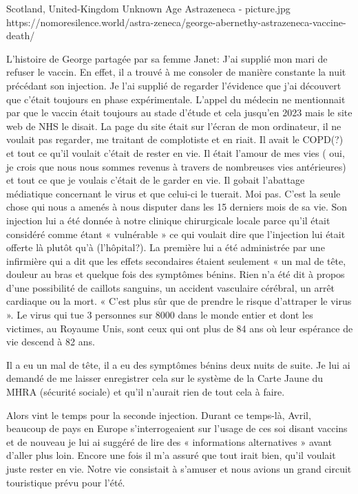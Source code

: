 {Scotland, United-Kingdom}
{Unknown Age}
{Astrazeneca}
{}
{-}
{picture.jpg}
{https://nomoresilence.world/astra-zeneca/george-abernethy-astrazeneca-vaccine-death/}
{

\normalsize

L’histoire de George partagée par sa femme Janet: J’ai supplié mon mari de refuser le vaccin. En effet, il a trouvé à me consoler de manière constante la nuit précédant son injection. Je l’ai supplié de regarder l’évidence que j’ai découvert que c’était toujours en phase expérimentale. L’appel du médecin ne mentionnait par que le vaccin était toujours au stade d’étude et cela jusqu’en 2023 mais le site web de NHS le disait. La page du site était sur l’écran de mon ordinateur, il ne voulait pas regarder, me traitant de complotiste et en riait. Il avait le COPD(?) et tout ce qu’il voulait c’était de rester en vie. Il était l’amour de mes vies ( oui, je crois que nous nous sommes revenus à travers de nombreuses vies antérieures) et tout ce que je voulais c’était de le garder en vie. Il gobait l’abattage médiatique concernant le virus et que celui-ci le tuerait. Moi pas. C’est la seule chose qui nous a amenés à nous disputer dans les 15 derniers mois de sa vie. Son injection lui a été donnée à notre clinique chirurgicale locale parce qu’il était considéré comme étant « vulnérable » ce qui voulait dire que l’injection lui était offerte là plutôt qu’à (l’hôpital?). La première lui a été administrée par une infirmière qui a dit que les effets secondaires étaient seulement « un mal de tête, douleur au bras et quelque fois des symptômes bénins. Rien n’a été dit à propos d’une possibilité de caillots sanguins, un accident vasculaire cérébral, un arrêt cardiaque ou la mort. « C’est plus sûr que de prendre le risque d’attraper le virus ». Le virus qui tue 3 personnes sur 8000 dans le monde entier et dont les victimes, au Royaume Unis, sont ceux qui ont plus de 84 ans où leur espérance de vie descend à 82 ans.

Il a eu un mal de tête, il a eu des symptômes bénins deux nuits de suite. Je lui ai demandé de me laisser enregistrer cela sur le système de la Carte Jaune du MHRA (sécurité sociale) et qu’il n’aurait rien de tout cela à faire.

Alors vint le temps pour la seconde injection. Durant ce temps-là, Avril, beaucoup de pays en Europe s’interrogeaient sur l’usage de ces soi disant vaccins et de nouveau je lui ai suggéré de lire des « informations alternatives » avant d’aller plus loin. Encore une fois il m’a assuré que tout irait bien, qu’il voulait juste rester en vie. Notre vie consistait à s’amuser et nous avions un grand circuit touristique prévu pour l’été.

}
